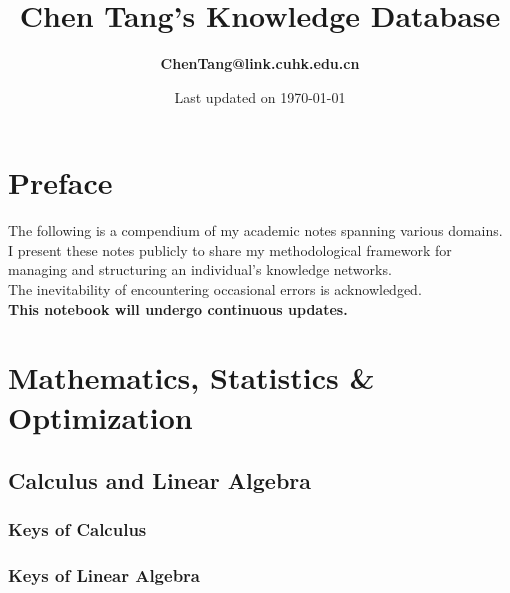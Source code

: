 \documentclass[12pt]{report}
\title{\textbf{Chen Tang's \break Knowledge Database}}
\author{\textbf{ChenTang@link.cuhk.edu.cn}}
\date{Last updated on \today}
\begin{document}
\maketitle

\chapter*{Preface}
\begin{center}
    {\Large The following is a compendium of my academic notes
        spanning various domains.
        I present these notes
        publicly to share my methodological framework for
        managing and structuring an individual's knowledge
        networks.\\
        The inevitability of encountering
        occasional errors is acknowledged.\\
        \bigskip
        \textbf{This notebook will undergo continuous updates.}}
\end{center}

\tableofcontents

\chapter{Mathematics, Statistics \& Optimization}

\section{Calculus and Linear Algebra}

\subsection{Keys of Calculus}

\subsection{Keys of Linear Algebra}
\end{document}
